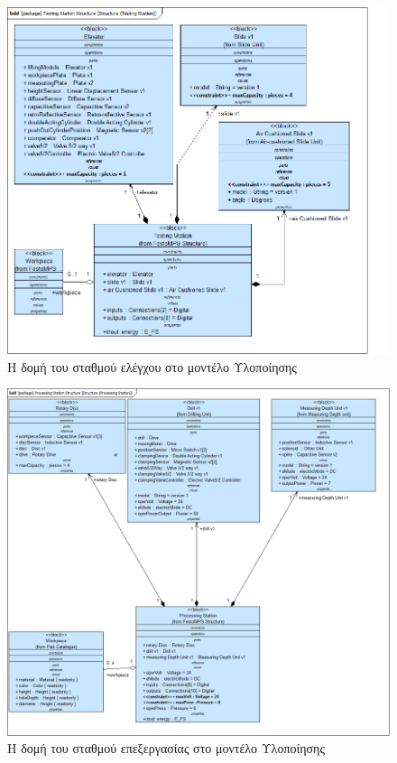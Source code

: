 \documentclass[a4paper,12pt,twoside]{report}
\begin{document}
\begin{appendices}
				\begin{figure}[hp]
					\centering
					\includegraphics[scale=0.50]{DesignModel_Structure(TestingStation).png}
					\caption{Η δομή του σταθμού ελέγχου στο μοντέλο Υλοποίησης}
					\label{φωτ:Η δομή του σταθμού ελέγχου στο μοντέλο Υλοποίησης}
				\end{figure}
				
				\begin{figure}[hp]
					\centering
					\includegraphics[scale=0.30]{DesignModel_Structure(ProcessingStation).png}
					\caption{Η δομή του σταθμού επεξεργασίας στο μοντέλο Υλοποίησης}
					\label{φωτ:Η δομή του σταθμού επεξεργασίας στο μοντέλο Υλοποίησης}
				\end{figure}
				

\end{appendices}
\end{document}
